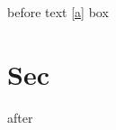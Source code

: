 \documentclass{article}
\begin{document}
before text \label{a} \ref{a} \cite{x} \mbox{box} 
\section{Sec}
after
\end{document}
